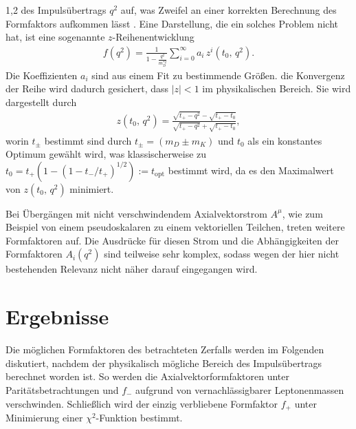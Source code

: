 \documentclass[11pt,a4paper,twoside,draft]{report}
\begin{document}
\begin{spacing}{1,2}
des Impulsübertrags $q^2$ auf, was Zweifel an einer korrekten Berechnung des Formfaktors aufkommen lässt \cite{PhysRev_Data}. Eine Darstellung, die ein solches Problem nicht hat,
ist eine sogenannte $z$-Reihenentwicklung \cite{formfactor_PhysRev}
\begin{align}
 f(q^2) = \frac{1}{1-\frac{q^2}{m^{*2}_D}} \sum\limits_{i=0}^\infty a_i\,z^i(t_0,\, q^2).
 \label{eq_formparam}
\end{align}
Die Koeffizienten $a_i$ sind
aus einem Fit zu bestimmende Größen. die Konvergenz der Reihe wird dadurch gesichert, dass $|z|<1$ im physikalischen Bereich. Sie wird dargestellt durch
\begin{align}
 z(t_0,\, q^2)= \frac{\sqrt{t_+-q^2}-\sqrt{t_+-t_0}}{\sqrt{t_+-q^2}+\sqrt{t_+-t_0}},
 \label{eq_zexpansion}
\end{align}
worin $t_\pm$ bestimmt sind durch $t_\pm = (m_D \pm m_K)$ und $t_0$ als ein konstantes Optimum gewählt wird, was klassischerweise zu 
$t_0 = t_+(1-(1-t_-/t_+)^{1/2}):=t_{\text{opt}}$ bestimmt wird, da es den Maximalwert von $z(t_0,\, q^2)$ minimiert.

\noindent
Bei Übergängen mit nicht verschwindendem Axialvektorstrom $A^\mu$, wie zum Beispiel von einem pseudoskalaren zu einem vektoriellen Teilchen, treten 
weitere Formfaktoren auf. Die Ausdrücke für diesen Strom und die Abhängigkeiten der Formfaktoren $A_i(q^2)$ sind teilweise sehr komplex, sodass wegen
der hier nicht bestehenden Relevanz nicht näher darauf eingegangen wird.

\chapter{Ergebnisse}
Die möglichen Formfaktoren des betrachteten Zerfalls werden im Folgenden diskutiert, nachdem der physikalisch mögliche Bereich des Impulsübertrags
berechnet worden ist. So werden die Axialvektorformfaktoren unter Paritätsbetrachtungen und $f_-$ aufgrund von vernachlässigbarer Leptonenmassen verschwinden.
Schließlich wird der einzig verbliebene Formfaktor $f_+$ unter Minimierung einer $\chi^2$-Funktion bestimmt.

\end{spacing}
\end{document}
